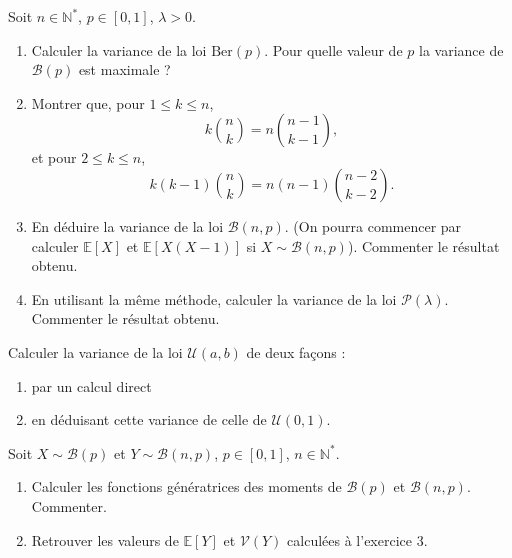 \medskip

\begin{mdframed}
\begin{exercice}
Soit $n \in \mathbb{N}^*$, $p \in [0, 1]$, $\lambda > 0$.

\begin{enumerate}
    \item Calculer la variance de la loi $\text{Ber}(p)$. Pour quelle valeur de $p$ la variance de $\mathcal{B}(p)$ est maximale ?
    \item Montrer que, pour $1 \leq k \leq n$,
    $$
    k \binom{n}{k} = n \binom{n - 1}{k - 1},
    $$
    et pour $2 \leq k \leq n$,
    $$
    k(k - 1) \binom{n}{k} = n(n - 1) \binom{n - 2}{k - 2}.
    $$
    \item En déduire la variance de la loi $\mathcal{B}(n, p)$. (On pourra commencer par calculer $\mathbb{E}[X]$ et $\mathbb{E}[X(X - 1)]$ si $X \sim \mathcal{B}(n, p)$). Commenter le résultat obtenu.
    \item En utilisant la même méthode, calculer la variance de la loi $\mathcal{P}(\lambda)$. Commenter le résultat obtenu.
\end{enumerate}
\end{exercice}
\end{mdframed}

\medskip

\begin{mdframed}
\begin{exercice}
Calculer la variance de la loi $\mathcal{U}(a, b)$ de deux façons :

\begin{enumerate}
    \item par un calcul direct
    \item en déduisant cette variance de celle de $\mathcal{U}(0, 1)$.
\end{enumerate}
\end{exercice}
\end{mdframed}

\medskip

\begin{mdframed}
\begin{exercice}
Soit $X \sim \mathcal{B}(p)$ et $Y \sim \mathcal{B}(n, p)$, $p \in [0, 1]$, $n \in \mathbb{N}^*$.

\begin{enumerate}
    \item Calculer les fonctions génératrices des moments de $\mathcal{B}(p)$ et $\mathcal{B}(n, p)$. Commenter.
    \item Retrouver les valeurs de $\mathbb{E}[Y]$ et $\mathcal{V}(Y)$ calculées à l'exercice 3.
\end{enumerate}
\end{exercice}
\end{mdframed}


